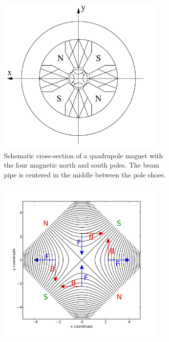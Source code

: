 \begin{figure}
\begin{subfigure}[t]{0.49\textwidth}
\centering
 \includegraphics[width=0.9\textwidth]{Figures/Quadrupole.png}
\caption[Cross-section of a quadrupole magnet]{Schematic cross-section of a quadrupole magnet with the four magnetic north and south poles.
The beam pipe is centered in the middle between the pole shoes.~\cite[p. 88]{Hinterberger}}
\label{fig:Quadrupole:cross_section}
\end{subfigure}\hfill
\begin{subfigure}[t]{0.49\textwidth}
\centering
 \includegraphics[width=0.9\textwidth]{Figures/Magnetic_field_quadrupole.png}

\end{subfigure}
\end{figure}
